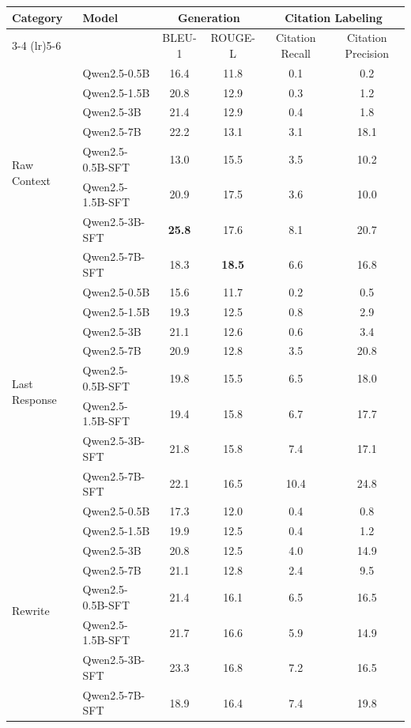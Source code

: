 \documentclass[11pt]{article}
\begin{document}
\begin{table}[hb]
    \centering
    \begin{tabular}{@{}llcccc@{}}
        \toprule
        \multirow{2}{*}{Category} &\multirow{2}{*}{\textbf{Model}} & \multicolumn{2}{c}{Generation} & \multicolumn{2}{c}{Citation Labeling} \\
        \cmidrule(lr){3-4}
        \cmidrule(lr){5-6}
        & & BLEU-1 & ROUGE-L & Citation Recall & Citation Precision \\
        \midrule

        \multirow{8}{*}{Raw Context} 
        &Qwen2.5-0.5B & 16.4  & 11.8 &0.1 &0.2 \\
        &Qwen2.5-1.5B & 20.8 & 12.9 & 0.3 & 1.2 \\
        &Qwen2.5-3B &  21.4  & 12.9 & 0.4 & 1.8\\
        &Qwen2.5-7B &  22.2  & 13.1 &3.1 &18.1\\
        \cmidrule(lr){2-6}
        &Qwen2.5-0.5B-SFT & 13.0  & 15.5 & 3.5 & 10.2\\
        &Qwen2.5-1.5B-SFT & 20.9  &17.5 &3.6 &10.0\\
        &Qwen2.5-3B-SFT & \textbf{25.8}  & 17.6 & 8.1 & 20.7 \\
        &Qwen2.5-7B-SFT & 18.3  & \textbf{18.5} & 6.6 &16.8\\  
        \midrule

        
        \multirow{8}{*}{Last Response} 
        &Qwen2.5-0.5B & 15.6 & 11.7 & 0.2 & 0.5 \\
        &Qwen2.5-1.5B & 19.3 & 12.5 & 0.8 & 2.9 \\
        &Qwen2.5-3B & 21.1 & 12.6 & 0.6 & 3.4  \\
        &Qwen2.5-7B & 20.9  & 12.8 & 3.5 & 20.8 \\
        \cmidrule(lr){2-6}
        &Qwen2.5-0.5B-SFT & 19.8 & 15.5 & 6.5 & 18.0\\
        &Qwen2.5-1.5B-SFT & 19.4 & 15.8 & 6.7 & 17.7\\
        &Qwen2.5-3B-SFT & 21.8 & 15.8 & 7.4 & 17.1\\
        &Qwen2.5-7B-SFT & 22.1 & 16.5 & 10.4 & 24.8\\  
        
        
        \midrule
        \multirow{8}{*}{Rewrite} 
        &Qwen2.5-0.5B & 17.3 & 12.0 & 0.4 & 0.8 \\
        &Qwen2.5-1.5B & 19.9 & 12.5& 0.4 & 1.2 \\
        &Qwen2.5-3B & 20.8 & 12.5 & 4.0 & 14.9 \\
        &Qwen2.5-7B & 21.1 & 12.8 & 2.4& 9.5 \\
        \cmidrule(lr){2-6}
        &Qwen2.5-0.5B-SFT & 21.4 & 16.1 & 6.5 & 16.5\\
        &Qwen2.5-1.5B-SFT & 21.7 & 16.6 & 5.9 & 14.9\\
        &Qwen2.5-3B-SFT & 23.3 & 16.8 & 7.2 & 16.5\\
        &Qwen2.5-7B-SFT & 18.9 & 16.4 & 7.4 & 19.8\\


\end{tabular}
\end{table}
\end{document}

